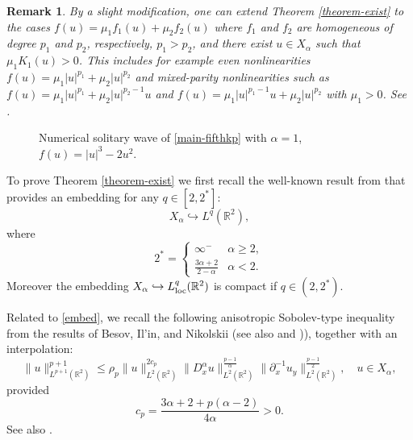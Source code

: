 \documentclass[10pt]{article}
\numberwithin{equation}{section}
\newtheorem{remark}[theorem]{\quad Remark}
\newcommand{\lt}{{L^2(\mathbb{R}^2)}}
\newcommand{\nd}{{\partial_x^{-1}}}
\newcommand{\dx}{D_x^{\alpha}}
\newcommand{\al}{\alpha}
\newcommand{\rr}{\mathbb{R}}
\newcommand{\rt}{{\mathbb{R}^2}}
\begin{document}
	\begin{remark}
		By a slight modification, one can extend Theorem \ref{theorem-exist} to the cases $f(u)=\mu_1f_1(u)+\mu_2f_2(u)$ where $f_1$ and $f_2$ are homogeneous of degree $p_1$ and $p_2$, respectively, $p_1>p_2$, and there exist $u\in X_\al$ such that $\mu_1K_1(u)>0$. This includes for example even nonlinearities $f(u)=\mu_1|u|^{p_1}+\mu_2|u|^{p_2}$ and mixed-parity nonlinearities such as $f(u)=\mu_1|u|^{p_1}+\mu_2|u|^{p_2-1}u$ and $f(u)=\mu_1|u|^{p_1-1}u+\mu_2|u|^{p_2}$ with $\mu_1>0$. See \cite{esfahani-levan-dpde}.   
	\end{remark}
	\begin{figure}[ht]
		\begin{center}
			\caption{Numerical solitary wave of  \eqref{main-fifthkp} with $\al=1$, $f(u)=|u|^3-2u^2$. }\label{nume-slt-1}
	\end{center}\end{figure}
	
	
	To prove Theorem \ref{theorem-exist} we first recall the well-known result from \cite{B:besov,liuwang} that provides an embedding for any \(q\in[2, 2^*]\):
	\begin{equation}\label{embed}
		X_\alpha\hookrightarrow L^q(\mathbb{R}^2),
	\end{equation}
	where
	\[
	2^*=\begin{cases}
		\infty^-&\alpha\geq2,\\
		\frac{3\alpha+2}{2-\alpha}&\alpha<2.
	\end{cases}
	\]
	Moreover the embedding 	$X_\al\hookrightarrow L^q_{\rm loc}(\rt) $ is compact if $q\in(2,2^	\ast)$.
	
	Related to \eqref{embed}, we recall  the following anisotropic Sobolev-type inequality  from the results of  Besov,   Il'in, and Nikolskii \cite{B:besov} (see also \cite[Proposition 2.2]{Borluk-Bruell-Nilsson} and \cite[Lemma 1.1]{lps})), together with an interpolation:
	\begin{equation}\label{bin}
		\|u\|_{L^{p+1}(\rr^2)}^{p+1}\leq \rho_p 
		\|u\|_\lt^{2c_p}
		\|\dx u\|_\lt^{\frac{p-1}{\al}}
		\|\nd u_y\|_\lt^{\frac{p-1}{2}},\quad u\in X_\al,
	\end{equation}
	provided
	\[
	c_p=\frac{3\al+2+p(\al-2)}{4\al}>0.
	\] 
	See also \cite[Lemma 2.1]{blt}.   
	
\end{document}
